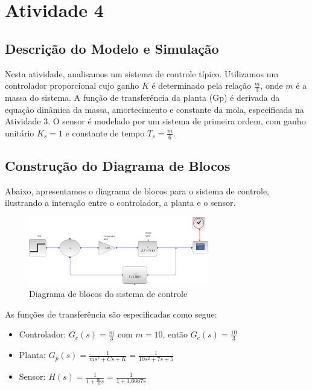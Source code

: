 \section{Atividade 4}

\subsection{Descrição do Modelo e Simulação}
Nesta atividade, analisamos um sistema de controle típico. Utilizamos um controlador proporcional cujo ganho \( K \) é determinado pela relação \( \frac{m}{3} \), onde \( m \) é a massa do sistema. A função de transferência da planta (Gp) é derivada da equação dinâmica da massa, amortecimento e constante da mola, especificada na Atividade 3. O sensor é modelado por um sistema de primeira ordem, com ganho unitário \( K_s = 1 \) e constante de tempo \( T_s = \frac{m}{6} \).

\subsection{Construção do Diagrama de Blocos}
Abaixo, apresentamos o diagrama de blocos para o sistema de controle, ilustrando a interação entre o controlador, a planta e o sensor.

\begin{figure}[H]
    \centering
    \includegraphics[width=0.7\textwidth]{4-atividade/assets/diagrama.png}
    \caption{Diagrama de blocos do sistema de controle}
    \label{fig:diagrama_blocos}
\end{figure}

As funções de transferência são especificadas como segue:
\begin{itemize}
    \item Controlador: \( G_c(s) = \frac{m}{3} \) com \( m = 10 \), então \( G_c(s) = \frac{10}{3} \)
    \item Planta: \( G_p(s) = \frac{1}{m s^2 + C s + K} = \frac{1}{10 s^2 + 7 s + 5} \)
    \item Sensor: \( H(s) = \frac{1}{1 + \frac{m}{6} s} = \frac{1}{1 + 1.6667 s} \)
\end{itemize}

